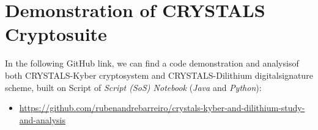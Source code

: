 \documentclass[runningheads]{llncs}
\numberwithin{equation}{section}
\begin{document}
    \appendix
    
    \section{Demonstration of CRYSTALS Cryptosuite}
    \label{sec:demonstration-crystals-cryptosuit}

    In the following GitHub link, we can find a code demonstration and analysis\break of both CRYSTALS-Kyber cryptosystem and CRYSTALS-Dilithium digital\break signature scheme, built on Script of \textit{Script (SoS) Notebook} (\textit{Java} and \textit{Python}):
    \begin{itemize}
        \item \footnotesize\href{https://github.com/rubenandrebarreiro/crystals-kyber-and-dilithium-study-and-analysis}{https://github.com/rubenandrebarreiro/crystals-kyber-and-dilithium-study-and-analysis}
    \end{itemize}

    
    

    \clearpage
    
    
    \label{bib:bibliography}
\end{document}
